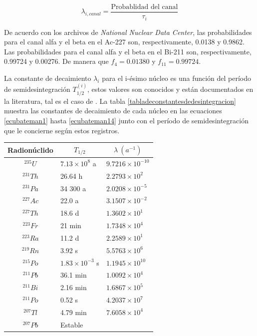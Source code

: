 $$\lambda_{i,canal}=\frac{\textrm{Probablidad del canal}}{\tau_i}$$

De acuerdo con los archivos de \textit{National Nuclear Data Center}, las probabilidades para el canal alfa y el beta en el Ac-227 son, respectivamente, 0.0138 y 0.9862. Las probabilidades para el canal alfa y el beta en el Bi-211 son, respectivamente, 0.99724 y 0.00276. De manera que $f_4=0.01380$ y $f_{11}=0.99724$.

La constante de decaimiento $\lambda_i$ para el i-ésimo núcleo es una función del período de semidesintegración $T_{1/2}^{(i)}$, estos valores son conocidos y están documentados en la literatura, tal es el caso de \cite{Flanagan1954}. La tabla \ref{tabladeconstantesdedesintegracion} muestra las constantes de decaimiento de cada núcleo en las ecuaciones \ref{ecubateman1} hasta \ref{ecubateman14} junto con el período de semidesintegración que le concierne según estos registros. 

\begin{center}
\noindent\begin{tabular}{|c|l|l|}
\hline
Radionúclido & \multicolumn{1}{c|}{$T_{1/2}$} & \multicolumn{1}{c|}{$\lambda\ (a^{-1})$} \\\hline\hline 
$^{235}U$ & $7.13\times10^8$ a & $9.7216\times 10^{-10}$ \\
$^{231}Th$ & 26.64 h & $2.2793\times 10^{2}$ \\
$^{231}Pa$ & 34 300 a & $2.0208\times 10^{-5}$ \\
$^{227}Ac$ & 22.0 a & $3.1507\times 10^{-2}$ \\
$^{227}Th$ & 18.6 d & $1.3602\times 10^{1}$ \\
$^{223}Fr$ & 21 min & $1.7348\times 10^{4}$ \\
$^{223}Ra$ & 11.2 d & $2.2589\times 10^{1}$ \\
$^{219}Rn$ & 3.92 s & $5.5763\times 10^{6}$ \\
$^{215}Po$ & $1.83\times10^{-3}$ s & $1.1945\times 10^{10}$ \\
$^{211}Pb$ & 36.1 min & $1.0092\times 10^{4}$ \\
$^{211}Bi$ & 2.16 min & $1.6867\times 10^{5}$ \\
$^{211}Po$ & 0.52 s & $4.2037\times 10^{7}$ \\
$^{207}Tl$ & 4.79 min & $7.6058\times 10^{4}$ \\
$^{207}Pb$ & Estable & \\\hline
\end{tabular}
\label{tabladeconstantesdedesintegracion}
\end{center}

